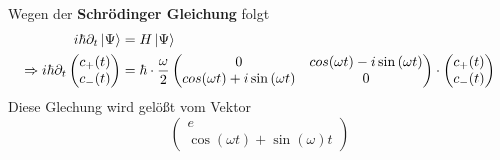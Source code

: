\documentclass{article}
\begin{document}
Wegen der \textbf{Schrödinger Gleichung} folgt
\begin{align*}
i\hbar \partial_t \ket{\Psi} &= H \ket{\Psi} \\
\Rightarrow i \hbar \partial_t \begin{pmatrix}
c_+(t) \\
c_-(t) \\
\end{pmatrix}
&= 
\hbar\cdot \frac{\omega}{2} \begin{pmatrix}
0 & cos{(\omega t)} - i\sin{(\omega t)} \\
cos{(\omega t)} + i\sin{(\omega t)} & 0 \\
\end{pmatrix}\cdot\begin{pmatrix}
c_+(t) \\
c_-(t) \\
\end{pmatrix}
\end{align*}
Diese Glechung wird gelößt vom Vektor 
\begin{equation}
	\begin{pmatrix}
	e^{}\\
	\cos{(\omega t)} + \sin{(\omega) t}
	\end{pmatrix}
\end{equation}
\end{document}
